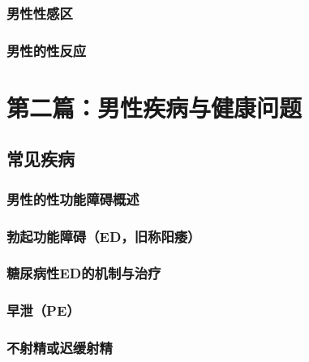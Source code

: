 \section{男性性感区}

\section{男性的性反应}

\part*{第二篇：男性疾病与健康问题}

\chapter{常见疾病}

\section{男性的性功能障碍概述}

\section{勃起功能障碍（ED，旧称阳痿）}

\section{糖尿病性ED的机制与治疗}

\section{早泄（PE）}

\section{不射精或迟缓射精}

